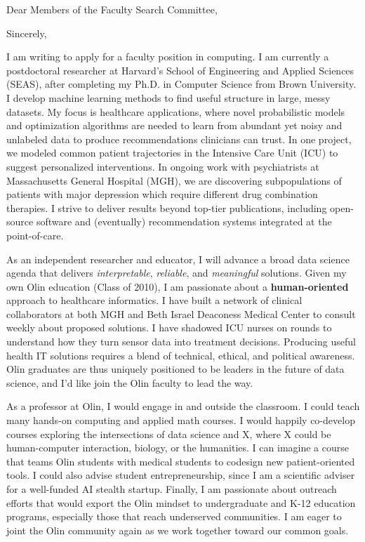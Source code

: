 \documentclass[11pt,letterpaper,roman]{moderncv}        %
\begin{document}
\date{October 28, 2017}
\opening{Dear Members of the Faculty Search Committee,}
\closing{Sincerely,}
\makelettertitle

I am writing to apply for a faculty position in computing.
I am currently a postdoctoral researcher at Harvard's School of Engineering and Applied Sciences (SEAS), after completing my Ph.D. in Computer Science from Brown University.
I develop machine learning methods 
to find useful structure in large, messy datasets.
My focus is healthcare applications, where novel probabilistic models and optimization algorithms are needed to learn from abundant yet noisy and unlabeled data to produce recommendations clinicians can trust.
In one project, we modeled common patient trajectories in the Intensive Care Unit (ICU) to suggest personalized interventions. In ongoing work with psychiatrists at Massachusetts General Hospital (MGH), we are discovering subpopulations of patients with major depression which require different drug combination therapies. 
I strive to deliver results beyond top-tier publications, including open-source software and (eventually) recommendation systems integrated at the point-of-care. 

As an independent researcher and educator, I will advance a broad data science agenda that delivers \emph{interpretable}, \emph{reliable}, and \emph{meaningful} solutions. Given my own Olin education (Class of 2010), I am passionate about a \textbf{human-oriented} approach to healthcare informatics. I have built a network of clinical collaborators at both MGH and Beth Israel Deaconess Medical Center to consult weekly about proposed solutions. I have shadowed ICU nurses on rounds to understand how they turn sensor data into treatment decisions. Producing useful health IT solutions requires a blend of technical, ethical, and political awareness. 
Olin graduates are thus uniquely positioned to be leaders in the future of data science, and I'd like join the Olin faculty to lead the way.

As a professor at Olin, I would engage in and outside the classroom. I could teach many hands-on computing and applied math courses. I would happily co-develop courses exploring the intersections of data science and X, where X could be human-computer interaction, biology, or the humanities. I can imagine a course that teams Olin students with medical students to codesign new patient-oriented tools.
I could also advise student entrepreneurship, 
since I am a scientific adviser for a well-funded AI stealth startup. Finally, I am passionate about outreach efforts that would export the Olin mindset to undergraduate and K-12 education programs, especially those that reach underserved communities. I am eager to joint the Olin community again as we work together toward our common goals.

\makeletterclosing
\end{document}
